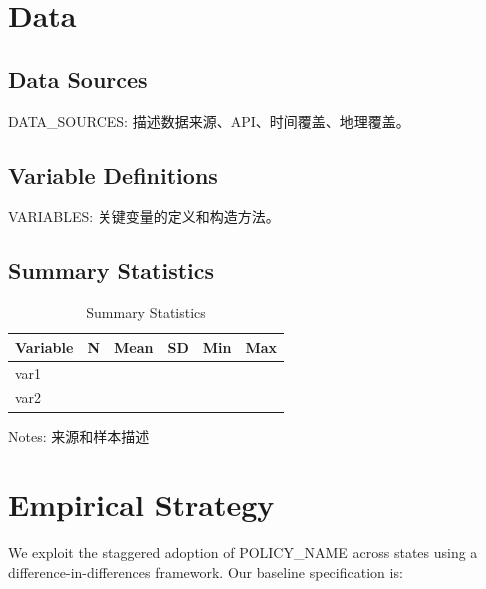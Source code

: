 \documentclass[12pt]{article}
\begin{document}
\section{Data} \label{sec:data}

\subsection{Data Sources}
{DATA_SOURCES: 描述数据来源、API、时间覆盖、地理覆盖。}

\subsection{Variable Definitions}
{VARIABLES: 关键变量的定义和构造方法。}

\subsection{Summary Statistics}

\begin{table}[H]
\centering
\caption{Summary Statistics}
\label{tab:summary}
\begin{threeparttable}
\begin{tabular}{lccccc}
\toprule
Variable & N & Mean & SD & Min & Max \\
\midrule
{var1} & & & & & \\
{var2} & & & & & \\
\bottomrule
\end{tabular}
\begin{tablenotes}
\small
\item Notes: {来源和样本描述}
\end{tablenotes}
\end{threeparttable}
\end{table}

\section{Empirical Strategy} \label{sec:strategy}

We exploit the staggered adoption of {POLICY_NAME} across states using a difference-in-differences framework. Our baseline specification is:
\end{document}
